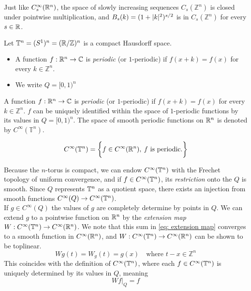 \documentclass[../main-v2-manifolds.tex]{subfiles}
\begin{document}
\begin{remark}
Just like $C^\infty_s({\mathbb{R}^n})$, the space of slowly increasing sequences $C_s(\mathbb{Z}^n)$ is closed under pointwise multiplication, and $B_s(k) = (1+\vert {k} \vert^2)^{s/2}$ is in $C_s(\mathbb{Z}^n)$ for every $s\in\mathbb{R}$.
\end{remark}
Let $\mathbb{T}^n = (S^1)^n = (\mathbb{R}/\mathbb{Z})^n$ is a compact Hausdorff space. 
\begin{itemize}
    \item A function $f: {\mathbb{R}^n}\to\mathbb{C}$ is \emph{periodic} (or $1$-periodic) if $f(x+k) = f(x)$ for every $k\in\mathbb{Z}^n$. 
    \item We write $Q = [0,1)^n$
\end{itemize}


\begin{definition}
A function $f: {\mathbb{R}^n}\to\mathbb{C}$ is \emph{periodic} (or $1$-periodic) if $f(x+k) = f(x)$ for every $k\in\mathbb{Z}^n$. $f$ can be uniquely identified within the space of $1$-periodic functions by its values in $Q=[0,1)^n$. The space of smooth periodic functions on ${\mathbb{R}^n}$ is denoted by $C^\infty(\mathbb{T}^n)$.

\[
C^\infty({\mathbb{T}^n}) = \biggl\{{f\in C^\infty({\mathbb{R}^n}),\: f\text{ is periodic.}}\biggr\}
\]
\end{definition}

    Because the $n$-torus is compact, we can endow $C^\infty({\mathbb{T}^n})$ with the Frechet topology of uniform convergence, and if $f\in C^\infty({\mathbb{T}^n})$, its \emph{restriction} onto the $Q$ is smooth. Since $Q$ represents ${\mathbb{T}^n}$ as a quotient space, there exists an injection from smooth functions $C^\infty(Q)\to C^\infty({\mathbb{T}^n})$. \\

If $g\in C^\infty(Q)$ the values of $g$ are completely determine by points in $Q$. We can extend $g$ to a pointwise function on ${\mathbb{R}^n}$ by the \emph{extension map} $W: C^\infty({\mathbb{T}^n})\to C^\infty({\mathbb{R}^n})$. We note that this sum in \cref{eq: extension map} converges to a smooth function in $C^\infty({\mathbb{R}^n})$, and $W: C^\infty({\mathbb{T}^n})\to C^\infty({\mathbb{R}^n})$ can be shown to be toplinear.
\begin{equation}
Wg(t) = W_g(t) = g(x)\quad \text{where } t-x\in\mathbb{Z}^n
\label{eq: extension map}
\end{equation}
This coincides with the definition of $C^\infty({\mathbb{T}^n})$, where each $f\in C^\infty({\mathbb{T}^n})$ is uniquely determined by its values in $Q$, meaning
\[
W {f\vert_{Q}} = f
\]
\end{document}
